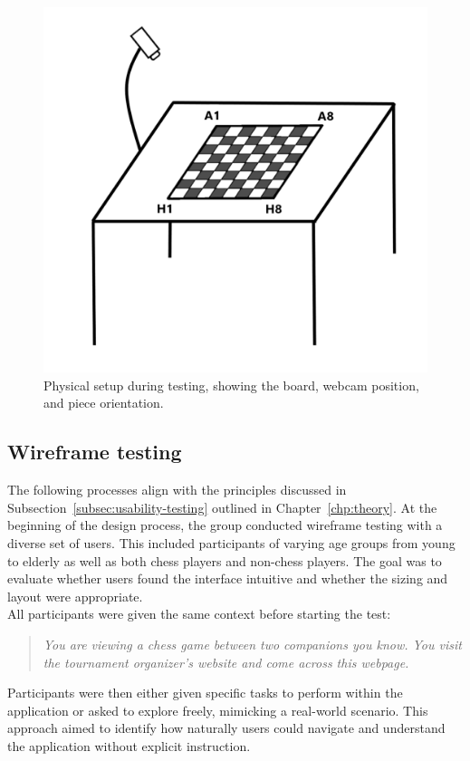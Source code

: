 \begin{figure}[h!]
    \centering
    \includegraphics[width=0.75\linewidth]{figures/methods/testing/setup.png}
    \caption[Setup during testing]{Physical setup during testing, showing the board, webcam position, and piece orientation.}
    \label{fig:setup}
\end{figure}



\subsection{Wireframe testing}
\label{subsubsec:user-centered-design}

The following processes align with the principles discussed in  Subsection~\ref{subsec:usability-testing} 
outlined in Chapter~\ref{chp:theory}. At the beginning of the design process, the group conducted wireframe testing with a diverse set of users. This included participants of varying age groups from young to elderly as well as both chess players and non-chess players. The goal was to evaluate whether users found the interface intuitive and whether the sizing and layout were appropriate. \\

All participants were given the same context before starting the test: 

\begin{quote}
\textit{You are viewing a chess game between two companions you know. You visit the tournament organizer's website and come across this webpage.}
\end{quote}

Participants were then either given specific tasks to perform within the application or asked to explore freely, mimicking a real-world scenario. This approach aimed to identify how naturally users could navigate and understand the application without explicit instruction. \\

